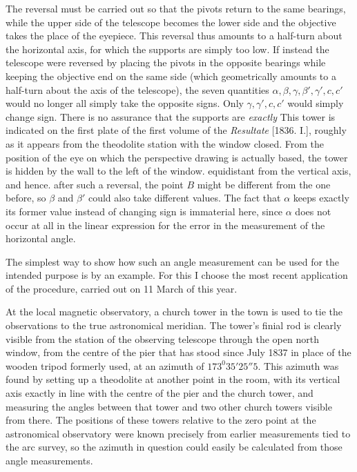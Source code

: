 The reversal must be carried out so that the pivots return to the same bearings, while the upper side of the telescope becomes the lower side and the objective takes the place of the eyepiece. This reversal thus amounts to a half-turn about the horizontal axis, for which the supports are simply too low. If instead the telescope were reversed by placing the pivots in the opposite bearings while keeping the objective end on the same side (which geometrically amounts to a half-turn about the axis of the telescope), the seven quantities $\alpha,\beta,\gamma,\beta',\gamma',c,c'$ would no longer all simply take the opposite signs. Only $\gamma,\gamma',c,c'$ would simply change sign. There is no assurance that the supports are \textit{exactly}
\expandafter\def\csname HistoricalNoteText445\endcsname{This tower is indicated on the first plate of the first volume of the \textit{Resultate} [1836. I.], roughly as it appears from the theodolite station with the window closed. From the position of the eye on which the perspective drawing is actually based, the tower is hidden by the wall to the left of the window.}%
equidistant from the vertical axis, and hence. after such a reversal, the point $B$ might be different from the one before, so $\beta$ and $\beta'$ could also take different values. The fact that $\alpha$ keeps exactly its former value instead of changing sign is immaterial here, since $\alpha$ does not occur at all in the linear expression for the error in the measurement of the horizontal angle.

The simplest way to show how such an angle measurement can be used for the intended purpose is by an example. For this I choose the most recent application of the procedure, carried out on 11 March of this year.

At the local magnetic observatory, a church tower in the town is used to tie the observations to the true astronomical meridian. The tower’s finial rod is clearly visible from the station of the observing telescope through the open north window, from the centre of the pier that has stood since July 1837 in place of the wooden tripod formerly used, at an azimuth of $173^0 35'25''5$. This azimuth was found by setting up a theodolite at another point in the room, with its vertical axis exactly in line with the centre of the pier and the church tower, and measuring the angles between that tower and two other church towers visible from there. The positions of these towers relative to the zero point at the astronomical observatory were known precisely from earlier measurements tied to the arc survey, so the azimuth in question could easily be calculated from those angle measurements.

